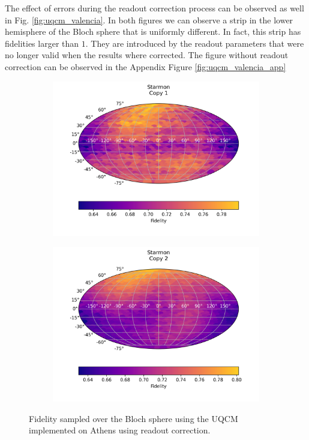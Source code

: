 The effect of errors during the readout correction process can be observed as well in Fig. \ref{fig:uqcm_valencia}. In both figures we can observe a strip in the lower hemisphere of the Bloch sphere that is uniformly different. In fact, this strip has fidelities larger than $1$. They are introduced by the readout parameters that were no longer valid when the results where corrected. The figure without readout correction can be observed in the Appendix Figure \ref{fig:uqcm_valencia_app}

\begin{figure}[H]
    \centering
    \begin{subfigure}{.5\textwidth}
      \centering
      \includegraphics[width=\textwidth]{Figures/UQCM/Starmon/FullSphere/results_corrected_starmon_copy1.png}
    \end{subfigure}%
    \begin{subfigure}{.5\textwidth}
      \centering
      \includegraphics[width=\textwidth]{Figures/UQCM/Starmon/FullSphere/results_corrected_starmon_copy2.png}
    \end{subfigure}
    \caption{Fidelity sampled over the Bloch sphere using the UQCM implemented on Athens using readout correction.}
    \label{fig:uqcm_athens}
\end{figure}

